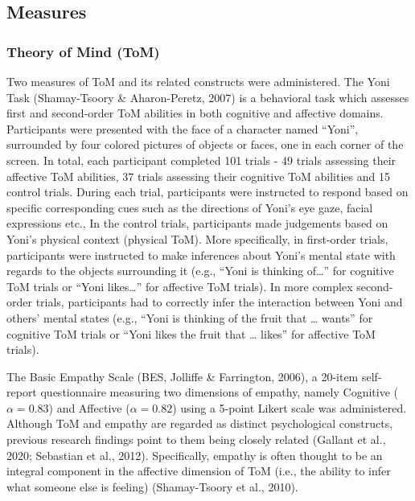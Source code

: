 \documentclass[
  man,mask,floatsintext]{apa6}
\begin{document}
\subsection{Measures}\label{measures}

\subsubsection{Theory of Mind (ToM)}\label{theory-of-mind-tom}

Two measures of ToM and its related constructs were administered. The Yoni Task (Shamay-Tsoory \& Aharon-Peretz, 2007) is a behavioral task which assesses first and second-order ToM abilities in both cognitive and affective domains. Participants were presented with the face of a character named ``Yoni'', surrounded by four colored pictures of objects or faces, one in each corner of the screen. In total, each participant completed 101 trials - 49 trials assessing their affective ToM abilities, 37 trials assessing their cognitive ToM abilities and 15 control trials. During each trial, participants were instructed to respond based on specific corresponding cues such as the directions of Yoni's eye gaze, facial expressions etc., In the control trials, participants made judgements based on Yoni's physical context (physical ToM). More specifically, in first-order trials, participants were instructed to make inferences about Yoni's mental state with regards to the objects surrounding it (e.g., ``Yoni is thinking of\ldots{}'' for cognitive ToM trials or ``Yoni likes\ldots{}'' for affective ToM trials). In more complex second-order trials, participants had to correctly infer the interaction between Yoni and others' mental states (e.g., ``Yoni is thinking of the fruit that \ldots{} wants'' for cognitive ToM trials or ``Yoni likes the fruit that \ldots{} likes'' for affective ToM trials).

The Basic Empathy Scale (BES, Jolliffe \& Farrington, 2006), a 20-item self-report questionnaire measuring two dimensions of empathy, namely Cognitive (\(\alpha = 0.83\)) and Affective (\(\alpha = 0.82\)) using a 5-point Likert scale was administered. Although ToM and empathy are regarded as distinct psychological constructs, previous research findings point to them being closely related (Gallant et al., 2020; Sebastian et al., 2012). Specifically, empathy is often thought to be an integral component in the affective dimension of ToM (i.e., the ability to infer what someone else is feeling) (Shamay-Tsoory et al., 2010).
\end{document}

